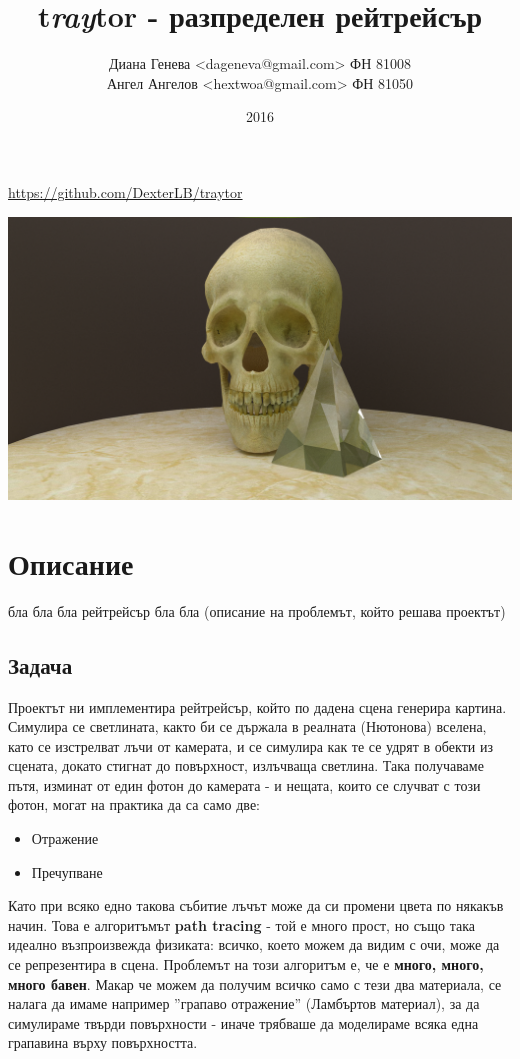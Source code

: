 \documentclass[12pt]{extarticle}
\title{t\textit{ray}tor - разпределен рейтрейсър}
\author{Диана Генева <dageneva@gmail.com> ФН 81008\\
Ангел Ангелов <hextwoa@gmail.com> ФН 81050}
\date{2016}
\begin{document}
\maketitle
\thispagestyle{empty}

\centerline{\url{https://github.com/DexterLB/traytor}}

\vspace{3cm}
\centerline{\includegraphics[width=\textwidth]{skull.png}}
\pagebreak

\section{Описание}
бла бла бла рейтрейсър бла бла (описание на проблемът, който решава
проектът)

\subsection{Задача}
Проектът ни имплементира рейтрейсър, който по дадена сцена генерира
картина. Симулира се светлината, както би се държала в реалната
(Нютонова) вселена, като се изстрелват лъчи от камерата, и се симулира
как те се удрят в обекти из сцената, докато стигнат до повърхност,
излъчваща светлина. Така получаваме пътя, изминат от един фотон до
камерата - и нещата, които се случват с този фотон, могат на практика да са само две:
\begin{itemize}
	\item Отражение
	\item Пречупване
\end{itemize}
Като при всяко едно такова събитие лъчът може да си промени цвета по
някакъв начин. Това е алгоритъмът \textbf{path tracing} - той е много
прост, но също така идеално възпроизвежда физиката:  всичко, което
можем да видим с очи, може да се репрезентира в сцена. Проблемът на
този алгоритъм е, че е \textbf{много, много, много бавен}. Макар че
можем да получим всичко само с тези два материала, се налага да имаме
например ''грапаво отражение'' (Ламбъртов материал), за да симулираме
твърди повърхности - иначе трябваше да моделираме всяка една грапавина
върху повърхността.
\end{document}
